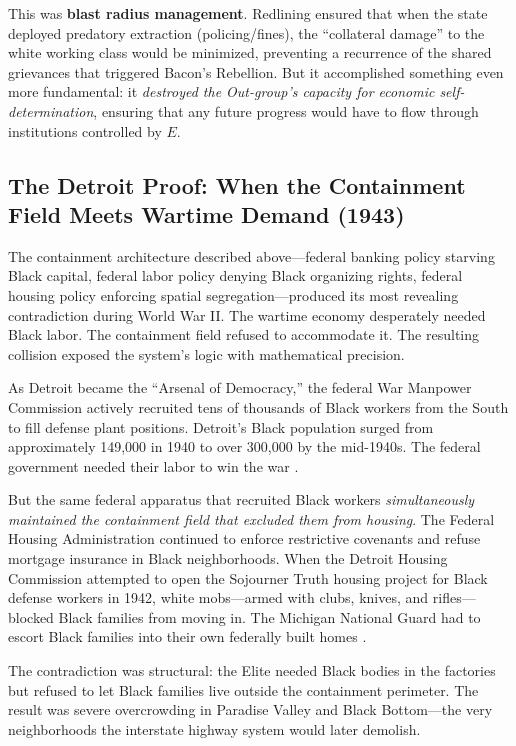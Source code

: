 \medskip

This was \textbf{blast radius management}. Redlining ensured that when the state deployed predatory extraction (policing/fines), the ``collateral damage'' to the white working class would be minimized, preventing a recurrence of the shared grievances that triggered Bacon's Rebellion. But it accomplished something even more fundamental: it \textit{destroyed the Out-group's capacity for economic self-determination}, ensuring that any future progress would have to flow through institutions controlled by $E$.

\subsection{The Detroit Proof: When the Containment Field Meets Wartime Demand (1943)}

The containment architecture described above---federal banking policy starving Black capital, federal labor policy denying Black organizing rights, federal housing policy enforcing spatial segregation---produced its most revealing contradiction during World War II. The wartime economy desperately needed Black labor. The containment field refused to accommodate it. The resulting collision exposed the system's logic with mathematical precision.

As Detroit became the ``Arsenal of Democracy,'' the federal War Manpower Commission actively recruited tens of thousands of Black workers from the South to fill defense plant positions. Detroit's Black population surged from approximately 149,000 in 1940 to over 300,000 by the mid-1940s. The federal government needed their labor to win the war \cite{sugrue_origins}.

But the same federal apparatus that recruited Black workers \textit{simultaneously maintained the containment field that excluded them from housing}. The Federal Housing Administration continued to enforce restrictive covenants and refuse mortgage insurance in Black neighborhoods. When the Detroit Housing Commission attempted to open the Sojourner Truth housing project for Black defense workers in 1942, white mobs---armed with clubs, knives, and rifles---blocked Black families from moving in. The Michigan National Guard had to escort Black families into their own federally built homes \cite{capeci_detroit}.

The contradiction was structural: the Elite needed Black bodies in the factories but refused to let Black families live outside the containment perimeter. The result was severe overcrowding in Paradise Valley and Black Bottom---the very neighborhoods the interstate highway system would later demolish.

